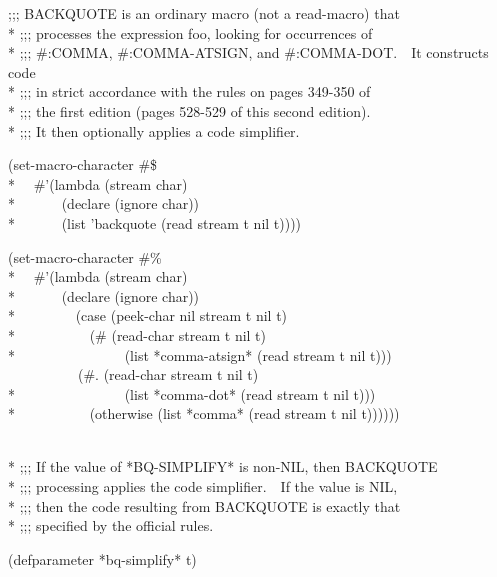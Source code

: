 \begin{new}
\begin{lisp}
;;; BACKQUOTE is an ordinary macro (not a read-macro) that \\*
;;; processes the expression foo, looking for occurrences of \\*
;;; \#:COMMA, \#:COMMA-ATSIGN, and \#:COMMA-DOT.~~It constructs code \\*
;;; in strict accordance with the rules on pages 349-350 of \\*
;;; the first edition (pages 528-529 of this second edition). \\*
;;; It then optionally applies a code simplifier.
\end{lisp}
\begin{lisp}
(set-macro-character \#{\Xbackslash}\$ \\*
~~\#'(lambda (stream char) \\*
~~~~~~(declare (ignore char)) \\*
~~~~~~(list 'backquote (read stream t nil t))))
\end{lisp}
\begin{lisp}
(set-macro-character \#{\Xbackslash}\% \\*
~~\#'(lambda (stream char) \\*
~~~~~~(declare (ignore char)) \\*
~~~~~~~~(case (peek-char nil stream t nil t) \\*
~~~~~~~~~~(\#{\Xbackslash}{\Xatsign} (read-char stream t nil t) \\*
~~~~~~~~~~~~~~~(list *comma-atsign* (read stream t nil t))) \\
~~~~~~~~~~(\#{\Xbackslash}. (read-char stream t nil t) \\*
~~~~~~~~~~~~~~~(list *comma-dot* (read stream t nil t))) \\*
~~~~~~~~~~(otherwise (list *comma* (read stream t nil t))))))
\end{lisp}
\begin{lisp}
 \\*
;;; If the value of *BQ-SIMPLIFY* is non-NIL, then BACKQUOTE \\*
;;; processing applies the code simplifier.~~If the value is NIL, \\*
;;; then the code resulting from BACKQUOTE is exactly that \\*
;;; specified by the official rules.
\end{lisp}
\begin{lisp}
(defparameter *bq-simplify* t)
\end{lisp}
\begin{lisp}

\end{lisp}
\end{new}
